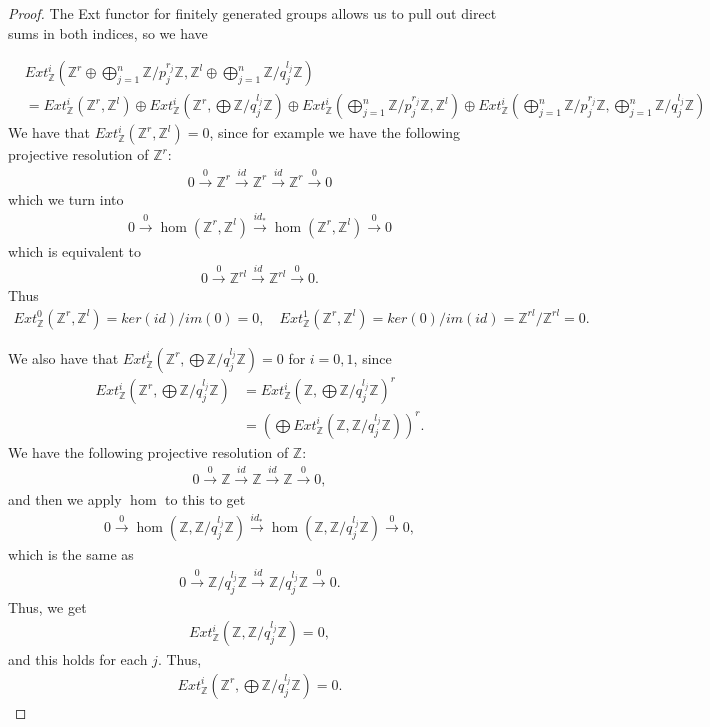 \documentclass[12pt]{extarticle}
\newcommand{\Z}{\mathbb{Z}}
\newcommand{\<}{\langle}
\renewcommand{\>}{\rangle}
\theoremstyle{definition}
\begin{document}
\begin{proof}
  The Ext functor for finitely generated groups allows us to pull out direct sums in both indices, so we have

  \begin{align*}
    & Ext_{\Z}^i(\Z^r \oplus \bigoplus\limits_{j=1}^n \Z/p_j^{r_j}\Z, \Z^l
    \oplus \bigoplus\limits_{j=1}^n \Z/q_j^{l_j}\Z) \\
    &= Ext_{\Z}^i(\Z^r, \Z^l) \oplus Ext_{\Z}^i(\Z^r, \bigoplus \Z/q_j^{l_j}\Z) \oplus Ext_{\Z}^i(\bigoplus\limits_{j=1}^n \Z/p_j^{r_j}\Z, \Z^l) \oplus Ext_{\Z}^i(\bigoplus\limits_{j=1}^n \Z/p_j^{r_j}\Z,\bigoplus\limits_{j=1}^n \Z/q_j^{l_j}\Z)
  \end{align*}
  We have that $Ext_{\Z}^i(\Z^r, \Z^l) = 0$, since for example we have the following projective resolution of $\Z^r$:
  \begin{align*}
    0 \xrightarrow{0} \Z^r \xrightarrow{id} \Z^r \xrightarrow{id} \Z^r \xrightarrow{0} 0 
  \end{align*}
  which we turn into
  \begin{align*}
    0 \xrightarrow{0} \hom(\Z^r,\Z^l) \xrightarrow{id_*} \hom(\Z^r, \Z^l) \xrightarrow{0} 0     
  \end{align*}
  which is equivalent to 
  \begin{align*}
    0 \xrightarrow{0} \Z^{rl} \xrightarrow{id} \Z^{rl} \xrightarrow{0} 0.
  \end{align*}
  Thus 
  \begin{align*}
    Ext_{\Z}^0(\Z^r, \Z^l) = ker(id)/im(0) = 0, \quad Ext_{\Z}^1(\Z^r, \Z^l) = ker(0)/im(id) = \Z^{rl}/\Z^{rl} = 0.
  \end{align*}

  We also have that $Ext_{\Z}^i(\Z^r, \bigoplus \Z/q_j^{l_j}\Z) = 0$ for $i=0,1$, since
  \begin{align*}
    Ext_{\Z}^i(\Z^r, \bigoplus \Z/q_j^{l_j}\Z)
    &= Ext_{\Z}^i(\Z, \bigoplus \Z/q_j^{l_j}\Z)^r \\
    &= (\bigoplus Ext_{\Z}^i(\Z,\Z/q_j^{l_j}\Z))^r.
  \end{align*}
  We have the following projective resolution of $\Z$:
  \begin{align*}
    0 \xrightarrow{0} \Z \xrightarrow{id} \Z \xrightarrow{id} \Z \xrightarrow{0} 0,
  \end{align*}
  and then we apply $\hom$ to this to get
  \begin{align*}
    0 \xrightarrow{0} \hom(\Z, \Z/q_j^{l_j}\Z) \xrightarrow{id_*} \hom(\Z, \Z/q_j^{l_j}\Z) \xrightarrow{0} 0,    
  \end{align*}
  which is the same as 
  \begin{align*}
    0 \xrightarrow{0} \Z/q_j^{l_j}\Z \xrightarrow{id} \Z/q_j^{l_j}\Z \xrightarrow{0} 0.
  \end{align*}
  Thus, we get
  \begin{align*}
    Ext_{\Z}^i(\Z,\Z/q_j^{l_j}\Z) = 0,
  \end{align*}
  and this holds for each $j$. Thus,
  \begin{align*}
    Ext_{\Z}^i(\Z^r, \bigoplus \Z/q_j^{l_j}\Z) = 0.
  \end{align*}


\end{proof}
\end{document}
